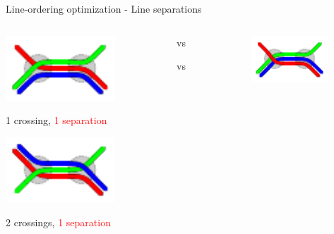 \documentclass{beamer}
\begin{document}
\begin{frame}{Line-ordering optimization - Line separations}	
	\begin{columns}[T]
		\begin{column}[T]{0.45\textwidth}
			\centering \includegraphics[width=0.7\textwidth]{figures/splitting_example_nonopt.pdf}

			1 crossing, \textcolor{red}{1 separation}

			\vspace{1.5cm}

			\centering \includegraphics[width=0.7\textwidth]{figures/splitting_example2_nonopt.pdf}

			2 crossings, \textcolor{red}{1 separation}
		\end{column}
		\begin{column}[T]{0.1\textwidth}
			\centering vs

			\centering vs
		\end{column}
		\begin{column}[T]{0.45\textwidth}			
			\centering \includegraphics[width=0.7\textwidth]{figures/splitting_example.pdf}


\end{column}
\end{columns}
\end{frame}
\end{document}
